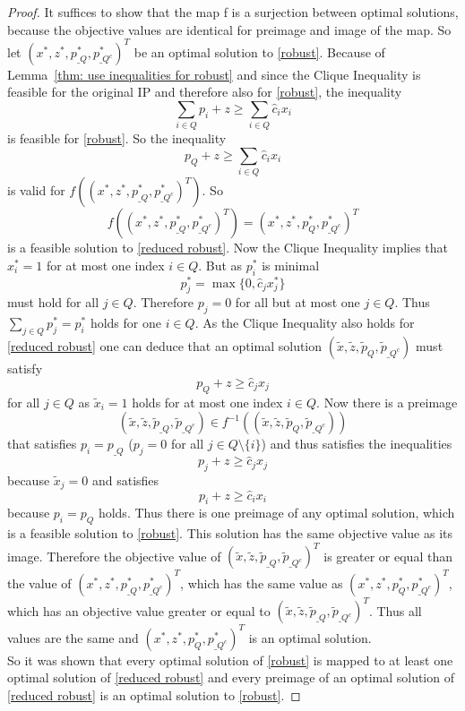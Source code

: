 \documentclass[titlepage, a4paper]{amsbook}
\theoremstyle{plain}
\theoremstyle{break}
\theoremstyle{definition}
\theoremstyle{remark}
\numberwithin{equation}{thm}
\begin{document}
\begin{proof}
It suffices to show that the map f is a surjection between optimal solutions, because the objective values are identical for preimage and image of the map.
So let $(x^*, z^*, p^*_{\_Q}, p^*_{\_Q^c})^T$ be an optimal solution to \eqref{robust}. Because of Lemma~\ref{thm: use inequalities for robust} and since the Clique Inequality is feasible for the original IP and therefore also for \eqref{robust}, the inequality
\[\sum_{i \in Q}p_i + z \geq \sum_{i \in Q}\hat{c}_ix_i\]
is feasible for \eqref{robust}.
So the inequality
\[p_Q + z \geq \sum_{i \in Q}\hat{c}_ix_i\]
is valid for $f\left((x^*, z^*, p^*_{\_Q}, p^*_{\_Q^c})^T\right)$. So \[f\left((x^*, z^*, p^*_{\_Q}, p^*_{\_Q^c})^T\right)=(x^*, z^*, p^*_{Q}, p^*_{\_Q^c})^T\]
is a feasible solution to \eqref{reduced robust}.
Now the Clique Inequality implies that $x^*_i=1$ for at most one index $i \in Q$. But as $p^*_i$ is minimal 
\[p^*_j=\max\{0, \hat{c}_jx^*_j\}\]
must hold for all $j \in Q$. Therefore $p_j=0$ for all but at most one $j \in Q$. Thus $\sum_{j \in Q}p^*_j=p^*_i$ holds for one $i \in Q$.
As the Clique Inequality also holds for \eqref{reduced robust} one can deduce that an optimal solution $(\tilde{x},\tilde{z},\tilde{p}_Q, \tilde{p}_{\_Q^c})$ must satisfy
\[p_Q+z \geq \hat{c}_jx_j\]
for all $j \in Q$ as $\tilde{x}_i=1$ holds for at most one index $i \in Q$. Now there is a preimage \[(\tilde{x},\tilde{z},\tilde{p}_{\_Q}, \tilde{p}_{\_Q^c}) \in f^{-1}((\tilde{x},\tilde{z},\tilde{p}_Q, \tilde{p}_{\_Q^c}))\] that
satisfies $p_i = p_{\_Q}$ ($p_j=0$ for all $j \in Q\setminus\{i\}$) and thus satisfies the inequalities
\[p_j + z \geq \hat{c}_jx_j\]
because $\tilde{x}_j=0$ and satisfies 
\[p_i + z \geq \hat{c}_ix_i\]
because $p_i=p_Q$ holds. Thus there is one preimage of any optimal solution, which is a feasible solution to \eqref{robust}. This solution has the same objective value as its image.
Therefore the objective value of $(\tilde{x},\tilde{z},\tilde{p}_{\_Q}, \tilde{p}_{\_Q^c})^T$ is greater or equal than the value of $(x^*, z^*, p^*_{\_Q}, p^*_{\_Q^c})^T$, which has the same value as $(x^*, z^*, p^*_{Q}, p^*_{\_Q^c})^T$, which has an objective value greater or equal to $(\tilde{x},\tilde{z},\tilde{p}_{\_Q}, \tilde{p}_{\_Q^c})^T$. Thus all values are the same and $(x^*, z^*, p^*_{Q}, p^*_{\_Q^c})^T$ is an optimal solution. \\
So it was shown that every optimal solution of \eqref{robust} is mapped to at least one optimal solution of \eqref{reduced robust} and every preimage of an optimal solution of \eqref{reduced robust} is an optimal solution to \eqref{robust}.
\end{proof}
\end{document}
